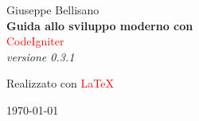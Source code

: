 
%
%
%
% 
%

\begin{titlepage}
\raggedleft %
\vspace*{\baselineskip} %
{\Large Giuseppe Bellisano}\\[0.167\textheight] %
{\LARGE\bfseries Guida allo sviluppo moderno con}\\[\baselineskip] %
{\textcolor{Red}{\Huge CodeIgniter}}\\[\baselineskip] %
{\Large \textit{versione 0.3.1}}\par %

\vfill %

{\large Realizzato con {\textcolor{Red}{ \LaTeX}}}\par %
\today

\vspace*{3\baselineskip} %
\end{titlepage}

